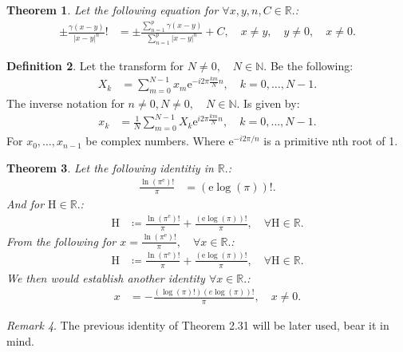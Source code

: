 \documentclass[10pt]{article}
\theoremstyle{plain}
\newtheorem{theorem}{Theorem}[section]
\theoremstyle{definition}
\newtheorem{definition}[theorem]{Definition}
\theoremstyle{remark}
\newtheorem{remark}[theorem]{Remark}
\begin{document}
\begin{theorem}
	Let the following equation for $\forall x, y, n, C \in \mathbb{R}.$:
	\begin{align*}
		\pm \frac{\gamma(x-y)}{|x - y|^{n}}! &= \pm \frac{\sum_{n=1}^{p}\gamma(x-y)}{\sum_{n=1}^{p}|x - y|^{n}} + C, \quad x \neq y, \quad y \neq 0, \quad x \neq 0.
	\end{align*}
\end{theorem}

\begin{definition}
	Let the transform for $N \neq 0, \quad N \in \mathbb{N}.$ Be the following:
	\begin{align*}
		X_k &= \sum_{m=0}^{N-1} x_{m}\mathrm{e}^{-i2\pi \frac{km}{N}n}, \quad k = 0,\dots,N-1.
	\end{align*}
	The inverse notation for $n \neq 0, N \neq 0, \quad N \in \mathbb{N}.$ Is given by:
	\begin{align*}
		x_k &= \frac{1}{N} \sum_{m=0}^{N-1} X_k \mathrm{e}^{i2\pi \frac{km}{N}n}, \quad k = 0,\dots,N-1.
	\end{align*}
	For $x_{0}, \dots, x_{n-1}$ be complex numbers. Where $\mathrm{e}^{-i2\pi /n}$ is a primitive nth root of 1.
\end{definition}

\begin{theorem}
	Let the following identitiy in $\mathbb{R}.$:
	\begin{align*}
		\frac{\ln(\pi^\mathrm{e})!}{\pi} &= (\mathrm{e} \log(\pi))!.
	\end{align*}
	And for $\mathrm{H} \in \mathbb{R}.$:
	\begin{align*}
		\mathrm{H} &\coloneq \frac{\ln(\pi^\mathrm{e})!}{\pi} + \frac{(\mathrm{e} \log(\pi))!}{\pi}, \quad \forall \mathrm{H} \in \mathbb{R}.
	\end{align*}
	From the following for $x = \frac{\ln(\pi^\mathrm{e})!}{\pi}, \quad \forall x \in \mathbb{R}.$:
	\begin{align*}
	\mathrm{H} &\coloneq \frac{\ln(\pi^\mathrm{e})!}{\pi} + \frac{(\mathrm{e} \log(\pi))!}{\pi}, \quad \forall \mathrm{H} \in \mathbb{R}.
	\end{align*}
	We then would establish another identity $\forall x \in \mathbb{R}.$:
	\begin{align*}
		x &= -\frac{(\log(\pi)!) (e \log(\pi))!}{\pi}, \quad x \neq 0.
	\end{align*}
\end{theorem}
\begin{remark}
	The previous identity of Theorem 2.31 will be later used, bear it in mind.
\end{remark}
\end{document}
